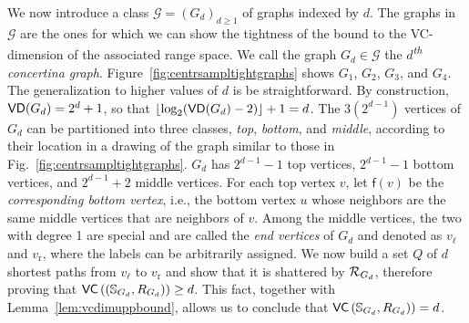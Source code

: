 We now introduce a class $\mathcal{G}=(G_d)_{d\ge 1}$ of graphs indexed by $d$.
The graphs in $\mathcal{G}$ are the ones for which we can show the tightness of
the bound to the VC-dimension of the associated range space.
We call the graph $G_d\in\mathcal{G}$ the \emph{$d$\textsuperscript{th} concertina graph}.
Figure~\ref{fig:centrsampltightgraphs} shows $G_1$, $G_2$, $G_3$, and $G_4$. The
generalization to higher values of $d$ is be straightforward.
By construction, $\mathsf{VD}(G_d)=2^d+1$, so that
$\lfloor\log_2(\mathsf{VD}(G_d)-2)\rfloor+1=d$. The $3(2^{d-1})$ vertices of $G_d$ can
be partitioned into three classes, \emph{top}, \emph{bottom}, and \emph{middle},
according to their location in a drawing of the graph similar to those in
Fig.~\ref{fig:centrsampltightgraphs}. $G_d$ has $2^{d-1}-1$ top vertices, $2^{d-1}-1$ bottom vertices, and
$2^{d-1}+2$ middle vertices. For each top vertex $v$, let $\mathsf{f}(v)$ be the
\emph{corresponding bottom vertex}, i.e., the bottom vertex $u$ whose neighbors
are the same middle vertices that are neighbors of $v$. Among the middle
vertices, the two with degree 1 are special and are called the \emph{end
vertices} of $G_d$ and denoted as $v_\ell$ and $v_\mathrm{r}$, where the
labels can be arbitrarily assigned. We now build a set $Q$ of $d$
shortest paths from $v_\ell$ to $v_\mathrm{r}$ and show that it is
shattered by $\mathcal{R}_{G_d}$, therefore proving that
$\mathsf{VC}\left((\mathbb{S}_{G_d},R_{G_d})\right)\ge d$.
This fact, together with Lemma~\ref{lem:vcdimuppbound}, allows us to conclude
that $\mathsf{VC}\left(\mathbb{S}_{G_d},R_{G_d})\right)=d$. 

